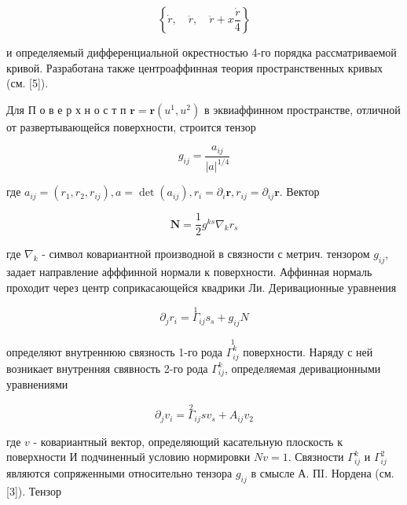 \documentclass[10pt]{article}
\begin{document}
\[

\left\{\dot{r}, \quad \ddot{r}, \quad \ddot{r}+x \frac{\dot{r}}{4}\right\}

\]



и определяемый дифференциальной окрестностью 4-го порядка рассматриваемой кривой. Разработана также центроаффинная теория пространственных кривых (см. [5]).



Для П о в е р х н о с т п $\boldsymbol{r}=\boldsymbol{r}\left(u^{1}, u^{2}\right)$ в эквиаффинном пространстве, отличной от развертывающейся поверхности, строится тензор



\[

g_{i j}=\frac{a_{i j}}{|a|^{1 / 4}}

\]



где $a_{i j}=\left(r_{1}, r_{2}, r_{i j}\right), a=\operatorname{det}\left(a_{i j}\right), r_{i}=\partial_{i} \boldsymbol{r}, r_{i j}=\partial_{i j} \boldsymbol{r}$. Вектор



\[

\boldsymbol{N}=\frac{1}{2} g^{k s} \nabla_{k} r_{s}

\]



где $\nabla_{k}$ - символ ковариантной производной в связности с метрич. тензором $g_{i j}$, задает направление афффинной нормали к поверхности. Аффинная нормаль проходит через центр соприкасающейся квадрики Ли. Деривационные уравнения



\[

\partial_{j} r_{i}=\stackrel{1}{\Gamma}_{i j} s_{s}+g_{i j} N

\]



определяют внутреннюю связность 1-го рода $\stackrel{1}{\Gamma_{i j}^{k}}$ поверхности. Наряду с ней возникает внутренняя свявность 2-го рода $\Gamma_{i j}^{k}$, определяемая деривационными уравнениями



\[

\partial_{j} v_{i}=\stackrel{2}{\Gamma}_{i j} s v_{s}+A_{i j} v_{2}

\]



где $v$ - ковариантный вектор, определяющий касательную плоскость к поверхности И подчиненный условию нормировки $N v=1$. Связности $\Gamma_{i j}^{k}$ и $\Gamma_{i j}^{2}$ являются сопряженными относительно тензора $g_{i j}$ в смысле А. ПI. Нордена (см. [3]). Тензор
\end{document}
